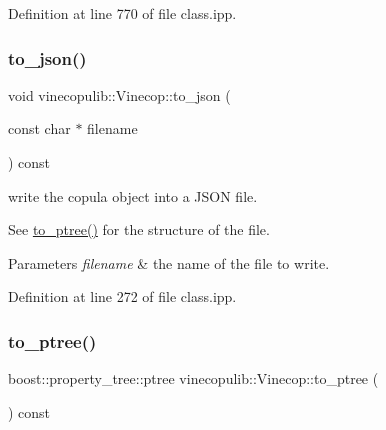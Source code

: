 Definition at line 770 of file class.\+ipp.

\mbox{\label{classvinecopulib_1_1_vinecop_acab8a34d8f89da6be0ab6ae77427c09f}} 
\subsubsection{\texorpdfstring{to\+\_\+json()}{to\_json()}}
{\footnotesize\ttfamily void vinecopulib\+::\+Vinecop\+::to\+\_\+json (\begin{DoxyParamCaption}\item[{const char $\ast$}]{filename }\end{DoxyParamCaption}) const\hspace{0.3cm}{\ttfamily [inline]}}



write the copula object into a J\+S\+ON file. 

See \hyperlink{classvinecopulib_1_1_vinecop_aaee91f92acc8402eb7358b65c8fe63f8}{to\+\_\+ptree()} for the structure of the file. 
\begin{DoxyParams}{Parameters}
{\em filename} & the name of the file to write. \\
\hline
\end{DoxyParams}


Definition at line 272 of file class.\+ipp.

\mbox{\label{classvinecopulib_1_1_vinecop_aaee91f92acc8402eb7358b65c8fe63f8}} 
\subsubsection{\texorpdfstring{to\+\_\+ptree()}{to\_ptree()}}
{\footnotesize\ttfamily boost\+::property\+\_\+tree\+::ptree vinecopulib\+::\+Vinecop\+::to\+\_\+ptree (\begin{DoxyParamCaption}{ }\end{DoxyParamCaption}) const\hspace{0.3cm}{\ttfamily [inline]}}



